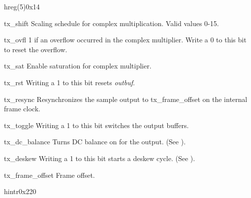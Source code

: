 \documentclass[12pt,a4paper,parskip=full,abstract=true,BCOR=12mm,twoside,open=right]{scrreprt}
\def\device#1{\textit{#1}}
\begin{document}
\begin{register}{h}{reg(5)}{0x14}%
    \label{reg5}%
    \regnewline%
    \begin{regdesc}\begin{reglist}
        \item[tx\_shift] Scaling schedule for complex multiplication. Valid values 0-15.
        \item[tx\_ovfl] 1 if an overflow occurred in the complex multiplier.
            Write a 0 to this bit to reset the overflow.
        \item[tx\_sat] Enable saturation for complex multiplier.
        \item[tx\_rst] Writing a 1 to this bit resets \device{outbuf}.
        \item[tx\_resync] Resynchronizes the sample output to
            tx\_frame\_offset on the internal frame clock.
        \item[tx\_toggle] Writing a 1 to this bit switches the output buffers.
        \item[tx\_dc\_balance] Turns DC balance on for the output. (See
            \cite{ds90cr485}).
        \item[tx\_deskew] Writing a 1 to this bit starts a deskew cycle. (See
            \cite{ds90cr485}).
        \item[tx\_frame\_offset] Frame offset.
    \end{reglist}\end{regdesc}
\end{register}
\begin{register}{h}{intr}{0x220}%
    \label{intr}%
    \regnewline%
\end{register}
\FloatBarrier %
\end{document}
